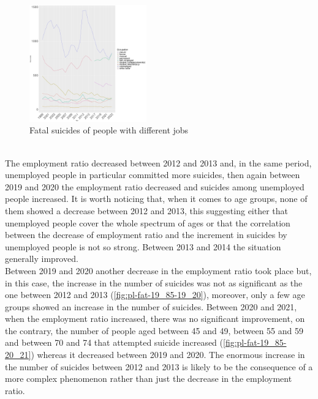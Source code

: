 \documentclass{article}
\begin{document}
\begin{figure}[H]
	\centering
	\includegraphics[width=0.45\textwidth]{imgs/pl-fat-job-1999.pdf}
	\caption{Fatal suicides of people with different jobs}
	\label{fig:pl-fat-job-1999}
\end{figure}
%
\hfill \\
%
The employment ratio decreased between 2012 and 2013 and, in the same period,
unemployed people in particular committed more suicides, then again between 2019 and 2020 
the employment ratio decreased and suicides among unemployed people increased.
%
It is worth noticing that, when it comes to age groups, none of them showed a decrease between 
2012 and 2013, this suggesting either that unemployed people cover the whole spectrum of ages
or that the correlation between the decrease of employment ratio and the increment in suicides by
unemployed people is not so strong.
Between 2013 and 2014 the situation generally improved. \\
Between 2019 and 2020 another decrease in the employment ratio took place but, in this
case, the increase in the number of suicides was not as significant as the one between 2012 and 2013
(\ref{fig:pl-fat-19_85-19_20}),
moreover, only a few age groups showed an increase in the number of suicides. 
Between 2020 and 2021, when the employment ratio increased, there was no significant improvement,
on the contrary, the number of people aged between 45 and 49, between 55 and 59 and between 70 and 74
that attempted suicide
increased (\ref{fig:pl-fat-19_85-20_21}) whereas it decreased between 2019 and 2020.
The enormous increase in the number of suicides between 2012 and 2013 is likely to be the consequence 
of a more complex phenomenon rather than just the decrease in the employment ratio.
%
%
\end{document}
